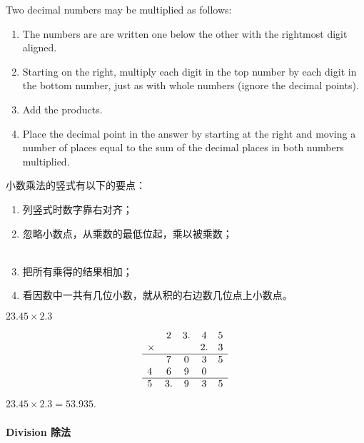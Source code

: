 \begin{paracol}{2}
Two decimal numbers may be multiplied as follows:
\begin{enumerate}
\item The numbers are are written one below the other with the rightmost digit aligned.
\item Starting on the right, multiply each digit in the top number by each digit in the bottom number, just as with whole numbers (ignore the decimal points).
\item Add the products.
\item Place the decimal point in the answer by starting at the right and moving a number of places equal to the sum of the decimal places in both numbers multiplied.
\end{enumerate}
\switchcolumn[1]
小数乘法的竖式有以下的要点：\\  
\begin{enumerate}
\item 列竖式时数字靠右对齐；\\ 
\item 忽略小数点，从乘数的最低位起，乘以被乘数；\\ \\ 
\item 把所有乘得的结果相加；
\item 看因数中一共有几位小数，就从积的右边数几位点上小数点。
\end{enumerate}
\end{paracol}

\begin{example}
$23.45\times 2.3$
\end{example}
\begin{solution}
$$
\begin{array}{lcccc}
&2&3.&4&5\\
\times&&&2.&3\\
\hline
&7&0&3&5\\
4&6&9&0&\\ \hline
5&3.&9&3&5
\end{array}
$$
$23.45\times 2.3= 53.935$.
\end{solution}

\paragraph{Division 除法} \ \ \\

